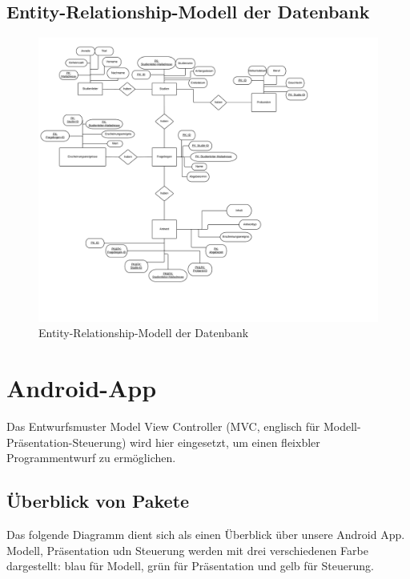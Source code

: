 \documentclass[a4paper]{scrreprt}
\begin{document}
        \newpage
        \section{Entity-Relationship-Modell der Datenbank}
            \begin{figure}[ht]
                \centering
                \includegraphics[scale = 0.13]{PSE_Datenbank_ERM.jpeg}
                \caption{Entity-Relationship-Modell der Datenbank}
            \end{figure}


    \newpage
    \chapter{Android-App}

        Das Entwurfsmuster Model View Controller (MVC, englisch für Modell-Präsentation-Steuerung) wird hier eingesetzt, um einen fleixbler Programmentwurf zu ermöglichen.


        \vspace*{1cm}
        \section{Überblick von Pakete}

            Das folgende Diagramm dient sich als einen Überblick über unsere Android App. Modell, Präsentation udn Steuerung werden mit drei verschiedenen Farbe dargestellt: blau für Modell, grün für Präsentation und gelb für Steuerung.
\end{document}
